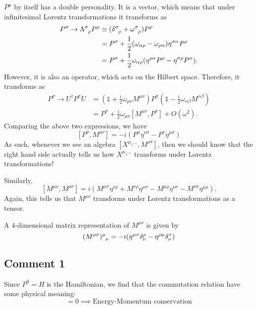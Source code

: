 $P^{\mu}$ by itself has a double personality. It is a vector, which means that under infinitesimal Lorentz transformations it transforms as
\begin{align}
  P^{\sigma} \to \Lambda\indices{^{\sigma}_{\rho}} P^{\rho} &\simeq (\delta\indices{^{\sigma}_{\rho}} + \omega\indices{^{\sigma}_{\rho}}) P^{\rho} \\
  &= P^{\sigma} + \frac{1}{2} (\omega_{\alpha\rho} - \omega_{\rho\alpha}) \eta^{\sigma\alpha} P^{\rho} \\
  &= P^{\sigma} + \frac{1}{2} \omega_{\alpha\rho} (\eta^{\rho\alpha} P^{\rho} - \eta^{\sigma\rho} P^{\alpha}).
\end{align} 
However, it is also an operator, which acts on the Hilbert space.
Therefore, it transforms as
\begin{align}
  P^{\sigma} \to U^{\dagger} P^{\sigma} U &= (\mathbb{1} + \frac{i}{2} \omega_{\mu\nu} M^{\mu\nu}) P^{\sigma} (\mathbb{1} - \frac{i}{2} \omega_{\alpha \beta} M^{\alpha \beta}) \\
					  &= P^{\sigma} +\frac{i}{2} \omega_{\mu\nu} [M^{\mu\nu}, P^{\sigma}] + O(\omega^2).
\end{align}
Comparing the above two expressions, we have
\begin{equation}
  \boxed{[P^{\sigma}, M^{\mu\nu}] = -i (P^{\mu} \eta^{\nu\sigma} - P^{\nu} \eta^{\mu\sigma})}
\end{equation}
As such, whenever we see an algebra $[X^{\mu_1 \dots}, M^{\rho\sigma}]$, then we should know that the right hand side actually tells us how $X^{\mu_1 \dots}$ transforms under Lorentz transformations!

Similarly, 
\begin{equation}
  \label{eq:mcom}
  \boxed{[M^{\mu\nu}, M^{\rho\sigma}] = i (M^{\mu\sigma} \eta^{\nu\rho} + M^{\nu\rho} \eta^{\mu\sigma} - M^{\mu\rho} \eta^{\nu\sigma} - M^{\nu\sigma} \eta^{\mu\rho})}.
\end{equation}
Again, this tells us that $M^{\mu\nu}$ transforms under Lorentz transformations as a tensor.

\begin{example}[]
  A $4$-dimensional matrix representation of $M^{\mu\nu}$ is given by
  \begin{equation}
    (M^{\rho\sigma})\indices{^{\mu}_{\nu}} = -i (\eta^{\mu\sigma} \delta^{\rho}_{\nu} - \eta^{\rho\mu} \delta^{\sigma}_{\nu})
  \end{equation}
\end{example}

\subsection*{Comment 1}%

Since $P^0 = H$ is the Hamiltonian, we find that the commutation relation have some physical meaning:
\begin{equation}
  [P^0, P^{\mu}] = 0 \implies \text{Energy-Momentum conservation}
\end{equation}
